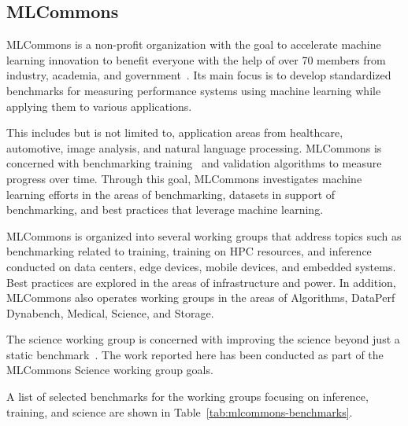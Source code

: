 \subsection{MLCommons}
\label{sec:mlcommons}

MLCommons is a non-profit organization with the goal to accelerate machine learning innovation to benefit everyone with the help of over 70 members from industry, academia, and government~\citep{www-mlcommons}.  Its main focus is to develop standardized benchmarks for measuring performance systems using machine learning while applying them to various applications.

This includes but is not limited to, application areas from healthcare, automotive, image analysis, and natural language processing. MLCommons is concerned with benchmarking training~\citep{mlperf-training} and validation algorithms to measure progress over time. Through this goal, MLCommons investigates machine learning efforts in the areas of benchmarking, datasets in support of benchmarking, and best practices that leverage machine learning.

MLCommons is organized into several working groups that address topics such as benchmarking related to training, training on HPC resources, and inference conducted on data centers, edge devices, mobile devices, and embedded systems. Best practices are explored in the areas of infrastructure and power. In addition, MLCommons also operates working groups in the areas of Algorithms, DataPerf Dynabench, Medical, Science, and Storage.

The science working group is concerned with improving the science beyond just a static benchmark~\citep{las-22-mlcommons-science}.  The work reported here has been conducted as part of the MLCommons Science working group goals.

A list of selected benchmarks for the working groups focusing on inference, training, and science are shown in Table~\ref{tab:mlcommons-benchmarks}.


